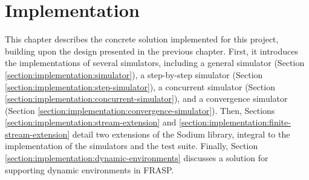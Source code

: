 
\chapter{Implementation}
\label{chapter:implementation}

This chapter describes the concrete solution implemented for this project,
building upon the design presented in the previous chapter. First, it
introduces the implementations of several simulators, including a general
simulator (Section \ref{section:implementation:simulator}), a step-by-step
simulator (Section \ref{section:implementation:step-simulator}), a concurrent
simulator (Section \ref{section:implementation:concurrent-simulator}), and a
convergence simulator (Section
\ref{section:implementation:convergence-simulator}). Then, Sections
\ref{section:implementation:stream-extension} and
\ref{section:implementation:finite-stream-extension} detail two extensions of
the Sodium library, integral to the implementation of the simulators and the
test suite. Finally, Section \ref{section:implementation:dynamic-environments}
discusses a solution for supporting dynamic environments in FRASP.







